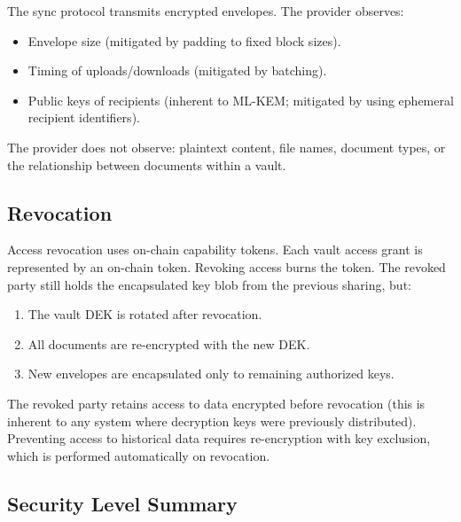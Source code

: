 The sync protocol transmits encrypted envelopes.  The provider observes:
\begin{itemize}[nosep]
  \item Envelope size (mitigated by padding to fixed block sizes).
  \item Timing of uploads/downloads (mitigated by batching).
  \item Public keys of recipients (inherent to ML-KEM; mitigated by
        using ephemeral recipient identifiers).
\end{itemize}

The provider does not observe: plaintext content, file names, document
types, or the relationship between documents within a vault.

\subsection{Revocation}

Access revocation uses on-chain capability tokens.  Each vault access
grant is represented by an on-chain token.  Revoking access burns the
token.  The revoked party still holds the encapsulated key blob from
the previous sharing, but:
\begin{enumerate}[nosep]
  \item The vault DEK is rotated after revocation.
  \item All documents are re-encrypted with the new DEK.
  \item New envelopes are encapsulated only to remaining authorized keys.
\end{enumerate}

The revoked party retains access to data encrypted before revocation
(this is inherent to any system where decryption keys were previously
distributed).  Preventing access to historical data requires re-encryption
with key exclusion, which is performed automatically on revocation.

\subsection{Security Level Summary}

